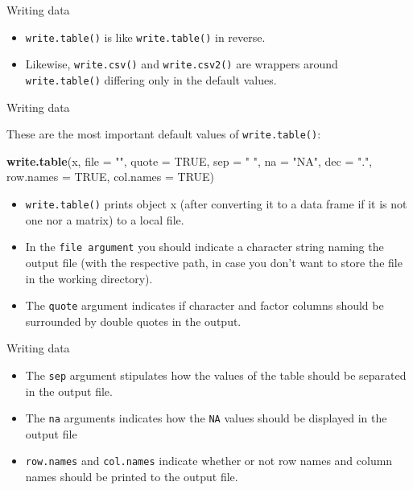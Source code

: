 \documentclass[ignorenonframetext,]{beamer}
\newenvironment{Shaded}{\begin{snugshade}}{\end{snugshade}}
\newcommand{\DataTypeTok}[1]{\textcolor[rgb]{0.13,0.29,0.53}{#1}}
\newcommand{\KeywordTok}[1]{\textcolor[rgb]{0.13,0.29,0.53}{\textbf{#1}}}
\newcommand{\NormalTok}[1]{#1}
\newcommand{\OtherTok}[1]{\textcolor[rgb]{0.56,0.35,0.01}{#1}}
\newcommand{\StringTok}[1]{\textcolor[rgb]{0.31,0.60,0.02}{#1}}
\begin{document}
\begin{frame}[fragile]{Writing data}
\protect\hypertarget{writing-data-1}{}

\begin{itemize}
\item
  \texttt{write.table()} is like \texttt{write.table()} in reverse.
\item
  Likewise, \texttt{write.csv()} and \texttt{write.csv2()} are wrappers
  around \texttt{write.table()} differing only in the default values.
\end{itemize}

\end{frame}

\begin{frame}[fragile]{Writing data}
\protect\hypertarget{writing-data-2}{}

These are the most important default values of \texttt{write.table()}:

\begin{Shaded}
\begin{Highlighting}[]
\KeywordTok{write.table}\NormalTok{(x, }\DataTypeTok{file =} \StringTok{""}\NormalTok{, }\DataTypeTok{quote =} \OtherTok{TRUE}\NormalTok{, }\DataTypeTok{sep =} \StringTok{" "}\NormalTok{,}
            \DataTypeTok{na =} \StringTok{"NA"}\NormalTok{, }\DataTypeTok{dec =} \StringTok{"."}\NormalTok{, }\DataTypeTok{row.names =} \OtherTok{TRUE}\NormalTok{,}
            \DataTypeTok{col.names =} \OtherTok{TRUE}\NormalTok{)}
\end{Highlighting}
\end{Shaded}

\begin{itemize}
\item
  \texttt{write.table()} prints object x (after converting it to a data
  frame if it is not one nor a matrix) to a local file.
\item
  In the \texttt{file\ argument} you should indicate a character string
  naming the output file (with the respective path, in case you don't
  want to store the file in the working directory).
\item
  The \texttt{quote} argument indicates if character and factor columns
  should be surrounded by double quotes in the output.
\end{itemize}

\end{frame}

\begin{frame}[fragile]{Writing data}
\protect\hypertarget{writing-data-3}{}

\begin{itemize}
\item
  The \texttt{sep} argument stipulates how the values of the table
  should be separated in the output file.
\item
  The \texttt{na} arguments indicates how the \texttt{NA} values should
  be displayed in the output file
\item
  \texttt{row.names} and \texttt{col.names} indicate whether or not row
  names and column names should be printed to the output file.
\end{itemize}

\end{frame}
\end{document}
